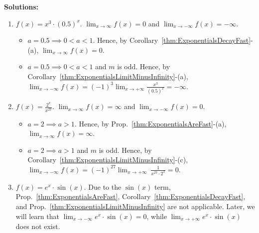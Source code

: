 \textbf{Solutions:}

\begin{enumerate}
\renewcommand{\labelenumi}{(\alph{enumi})}
\setlength{\itemsep}{.3cm}
    
\item  $f(x) = x^3 \cdot (0.5)^x$. \Ans $\displaystyle\lim_{x \to \infty} f(x) = 0$ and $\displaystyle\lim_{x \to -\infty} f(x) = -\infty$.

\begin{itemize}
    \item $a=0.5 \implies 0 < a < 1$. Hence, by Corollary~\ref{thm:ExponentialsDecayFast}-(a), $\displaystyle\lim_{x \to \infty} f(x) = 0$.
    \item  $a=0.5 \implies 0 < a < 1$ and $m$ is odd. Hence, by Corollary~\ref{thm:ExponentialsLimitMinusInfinity}-(a), $\displaystyle\lim_{x \to -\infty} f(x) = (-1)^3 \displaystyle{\lim_{x \to +\infty}} \frac{x^3}{(0.5)^x} = -\infty $.
\end{itemize}

\item  $f(x) =  \frac{2^x}{ x^{27} }$. \Ans $\displaystyle\lim_{x \to \infty} f(x) = \infty$ and $\displaystyle\lim_{x \to -\infty} f(x) = 0$.

\begin{itemize}
    \item $a=2 \implies a>1$. Hence, by Prop.~\ref{thm:ExponentialsAreFast}-(a), $\displaystyle\lim_{x \to \infty} f(x) = \infty$.
    \item  $a=2 \implies a>1$ and $m$ is odd. Hence, by Corollary~\ref{thm:ExponentialsLimitMinusInfinity}-(c), $\displaystyle{\lim_{x \to -\infty}} f(x) = (-1)^{27} \displaystyle{ \lim_{x \to + \infty} } ~ \frac{1}{x^{27} \cdot 2^x} = 0 $.
\end{itemize}

\item   $f(x) = e^x \cdot \sin(x)$. \Ans Due to the $\sin(x)$ term, Prop.~\ref{thm:ExponentialsAreFast}, Corollary~\ref{thm:ExponentialsDecayFast}, and Prop.~\ref{thm:ExponentialsLimitMinusInfinity} are not applicable. Later, we will learn that  $\displaystyle\lim_{x \to -\infty} e^x \cdot \sin(x) =0$, while  $\displaystyle\lim_{x \to +\infty} e^x \cdot \sin(x)$ does not exist.


\end{enumerate}

